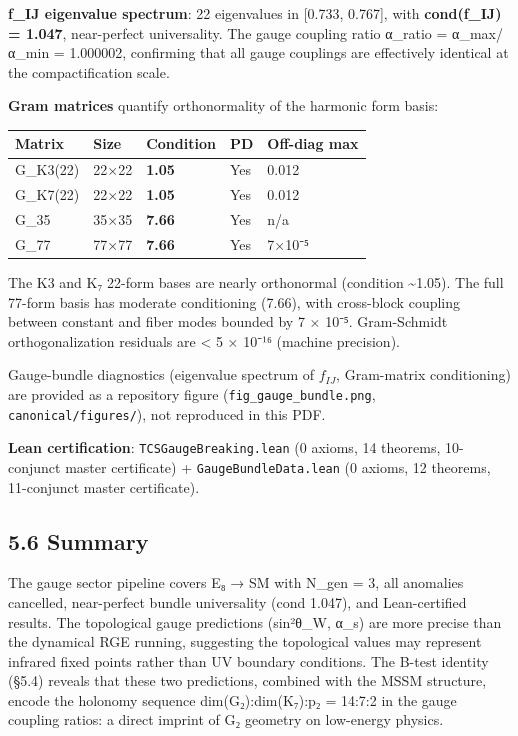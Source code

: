 \documentclass[11pt,a4paper]{article}
\begin{document}
\textbf{f\_\allowbreak{}IJ eigenvalue spectrum}: 22 eigenvalues in {[}0.733, 0.767{]}, with \textbf{cond(f\_\allowbreak{}IJ) = 1.047}, near-perfect universality. The gauge coupling ratio α\_\allowbreak{}ratio = α\_\allowbreak{}max/α\_\allowbreak{}min = 1.000002, confirming that all gauge couplings are effectively identical at the compactification scale.

\textbf{Gram matrices} quantify orthonormality of the harmonic form basis:

\begin{longtable}[]{@{}lllll@{}}
\toprule\noalign{}
Matrix & Size & Condition & PD & Off-diag max \\
\midrule\noalign{}
\endhead
\bottomrule\noalign{}
\endlastfoot
G\_\allowbreak{}K3(22) & 22×22 & \textbf{1.05} & Yes & 0.012 \\
G\_\allowbreak{}K7(22) & 22×22 & \textbf{1.05} & Yes & 0.012 \\
G\_\allowbreak{}35 & 35×35 & \textbf{7.66} & Yes & n/a \\
G\_\allowbreak{}77 & 77×77 & \textbf{7.66} & Yes & 7×10⁻⁵ \\
\end{longtable}

The K3 and K₇ 22-form bases are nearly orthonormal (condition \textasciitilde1.05). The full 77-form basis has moderate conditioning (7.66), with cross-block coupling between constant and fiber modes bounded by 7 × 10⁻⁵. Gram-Schmidt orthogonalization residuals are \textless{} 5 × 10⁻¹⁶ (machine precision).

Gauge-bundle diagnostics (eigenvalue spectrum of \(f_{IJ}\), Gram-matrix conditioning) are provided as a repository figure (\texttt{fig\_\allowbreak{}gauge\_\allowbreak{}bundle.\allowbreak{}png}, \texttt{canonical/\allowbreak{}figures/\allowbreak{}}), not reproduced in this PDF.

\textbf{Lean certification}: \texttt{TCSGauge\allowbreak{}Breaking.\allowbreak{}lean} (0 axioms, 14 theorems, 10-conjunct master certificate) + \texttt{Gauge\allowbreak{}Bundle\allowbreak{}Data.\allowbreak{}lean} (0 axioms, 12 theorems, 11-conjunct master certificate).

\subsection{5.6 Summary}\label{summary}

The gauge sector pipeline covers E₈ → SM with N\_\allowbreak{}gen = 3, all anomalies cancelled, near-perfect bundle universality (cond 1.047), and Lean-certified results. The topological gauge predictions (sin²θ\_\allowbreak{}W, α\_\allowbreak{}s) are more precise than the dynamical RGE running, suggesting the topological values may represent infrared fixed points rather than UV boundary conditions. The B-test identity (§5.4) reveals that these two predictions, combined with the MSSM structure, encode the holonomy sequence dim(G₂):dim(K₇):p₂ = 14:7:2 in the gauge coupling ratios: a direct imprint of G₂ geometry on low-energy physics.
\end{document}

